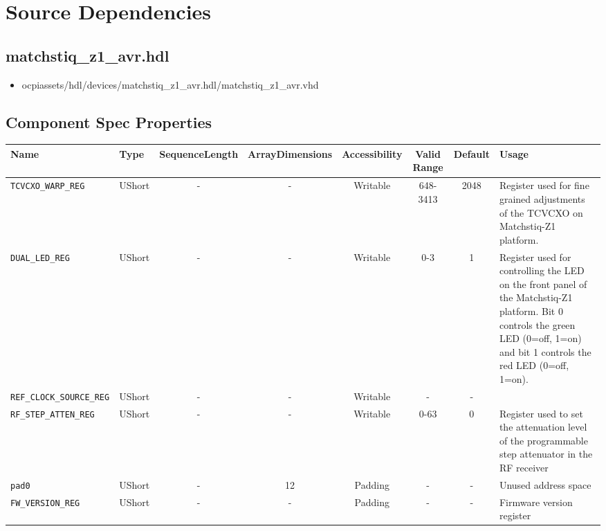 \documentclass{article}
\def\comp{matchstiq\_z1\_avr}
\begin{document}
\section*{Source Dependencies}
\subsection*{\comp.hdl}
\begin{itemize}
	\item ocpiassets/hdl/devices/\comp.hdl/\comp.vhd
\end{itemize}

\begin{landscape}
\section*{Component Spec Properties}
\begin{scriptsize}
		\begin{tabular}{|p{4cm}|p{1cm}|c|c|c|c|c|p{7cm}|}
			\hline
			\rowcolor{blue}
			Name               & Type   & SequenceLength & ArrayDimensions   & Accessibility       & Valid Range                                                                      & Default & Usage                                                                        \\
			\hline
			\verb+TCVCXO_WARP_REG+          & UShort  & - & -  & Writable & 648-3413 & 2048     & Register used for fine grained adjustments of the TCVCXO on Matchstiq-Z1 platform. \\
			\hline
			\verb+DUAL_LED_REG+             & UShort  & - & -  & Writable & 0-3      & 1        & Register used for controlling the LED on the front panel of the Matchstiq-Z1 platform. Bit 0 controls the green LED (0=off, 1=on) and bit 1 controls the red LED (0=off, 1=on). \\
			\hline
			\verb+REF_CLOCK_SOURCE_REG+     & UShort  & - & -  & Writable & -        & -        & \\
			\hline
			\verb+RF_STEP_ATTEN_REG+        & UShort  & - & -  & Writable & 0-63     & 0        & Register used to set the attenuation level of the programmable step attenuator in the RF receiver \\
			\hline
			\verb+pad0+                     & UShort  & - & 12 & Padding  & -        & -        & Unused address space \\
			\hline
			\verb+FW_VERSION_REG+           & UShort  & - & -  & Padding  & -        & -        & Firmware version register \\

\end{tabular}
\end{scriptsize}
\end{landscape}
\end{document}
